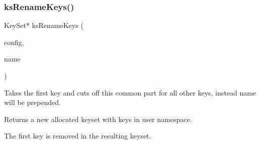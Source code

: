 \subsubsection{\texorpdfstring{ks\+Rename\+Keys()}{ksRenameKeys()}}
{\footnotesize\ttfamily Key\+Set$\ast$ ks\+Rename\+Keys (\begin{DoxyParamCaption}\item[{Key\+Set $\ast$}]{config,  }\item[{const char $\ast$}]{name }\end{DoxyParamCaption})}



Takes the first key and cuts off this common part for all other keys, instead name will be prepended. 

\begin{DoxyReturn}{Returns}
a new allocated keyset with keys in user namespace.
\end{DoxyReturn}
The first key is removed in the resulting keyset. 